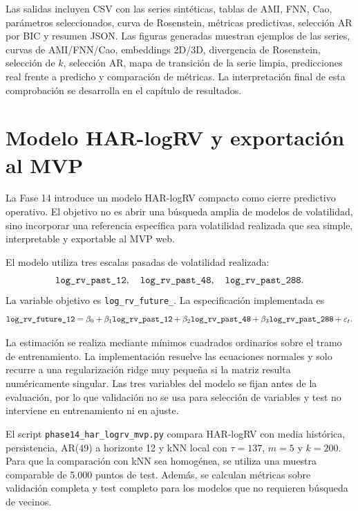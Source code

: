 Las salidas incluyen CSV con las series sintéticas, tablas de AMI, FNN, Cao, parámetros seleccionados, curva de Rosenstein, métricas predictivas, selección AR por BIC y resumen JSON. Las figuras generadas muestran ejemplos de las series, curvas de AMI/FNN/Cao, embeddings 2D/3D, divergencia de Rosenstein, selección de \(k\), selección AR, mapa de transición de la serie limpia, predicciones real frente a predicho y comparación de métricas. La interpretación final de esta comprobación se desarrolla en el capítulo de resultados.

\section{Modelo HAR-logRV y exportación al MVP}\label{sec:har-logrv-exportacion}

La Fase 14 introduce un modelo HAR-logRV compacto como cierre predictivo operativo. El objetivo no es abrir una búsqueda amplia de modelos de volatilidad, sino incorporar una referencia específica para volatilidad realizada que sea simple, interpretable y exportable al MVP web.

El modelo utiliza tres escalas pasadas de volatilidad realizada:
\[
    \texttt{log\_\allowbreak rv\_\allowbreak past\_\allowbreak 12},\quad
    \texttt{log\_\allowbreak rv\_\allowbreak past\_\allowbreak 48},\quad
    \texttt{log\_\allowbreak rv\_\allowbreak past\_\allowbreak 288}.
\]
La variable objetivo es \texttt{log\_\allowbreak rv\_\allowbreak future\_}. La especificación implementada es
\begin{equation}
    \texttt{log\_\allowbreak rv\_\allowbreak future\_\allowbreak 12}
    =
    \beta_0
    + \beta_1 \texttt{log\_\allowbreak rv\_\allowbreak past\_\allowbreak 12}
    + \beta_2 \texttt{log\_\allowbreak rv\_\allowbreak past\_\allowbreak 48}
    + \beta_3 \texttt{log\_\allowbreak rv\_\allowbreak past\_\allowbreak 288}
    + \varepsilon_t.
\end{equation}

La estimación se realiza mediante mínimos cuadrados ordinarios sobre el tramo de entrenamiento. La implementación resuelve las ecuaciones normales y solo recurre a una regularización ridge muy pequeña si la matriz resulta numéricamente singular. Las tres variables del modelo se fijan antes de la evaluación, por lo que validación no se usa para selección de variables y test no interviene en entrenamiento ni en ajuste.

El script \texttt{phase14\_\allowbreak har\_\allowbreak logrv\_\allowbreak mvp.py} compara HAR-logRV con media histórica, persistencia, AR(49) a horizonte 12 y kNN local con \(\tau=137\), \(m=5\) y \(k=200\). Para que la comparación con kNN sea homogénea, se utiliza una muestra comparable de 5.000 puntos de test. Además, se calculan métricas sobre validación completa y test completo para los modelos que no requieren búsqueda de vecinos.

